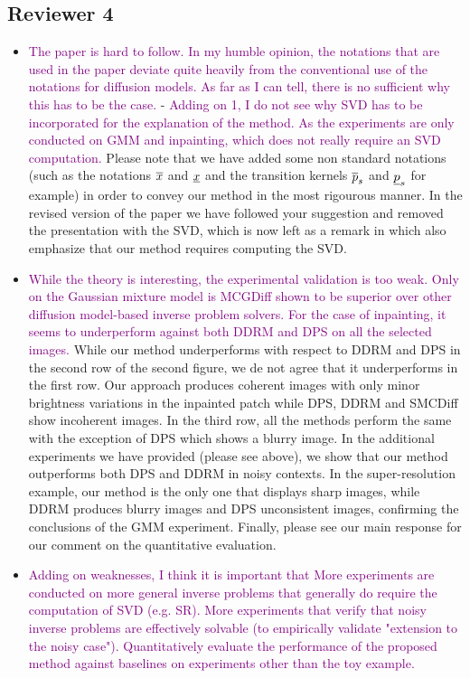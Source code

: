 \documentclass{article}
\newcommand{\question}[1]{\textcolor{purple}{#1}}
\begin{document}
\subsection*{Reviewer 4}
\begin{itemize}
    \item \question{The paper is hard to follow. In my humble opinion, the notations that are used in the paper deviate quite heavily from the conventional use of the notations for diffusion models. As far as I can tell, there is no sufficient why this has to be the case.} - \question{Adding on 1, I do not see why SVD has to be incorporated for the explanation of the method. As the experiments are only conducted on GMM and inpainting, which does not really require an SVD computation.} Please note that we have added some non standard notations (such as the notations $\overline{x}$ and $\underline{x}$ and the transition kernels $\tbwtrans{}{s}{}{}$ and $\bbwtrans{}{s}{}{}$ for example) in order to convey our method in the most rigourous manner. In the revised version of the paper we have followed your suggestion and removed the presentation with the SVD, which is now left as a remark in which also emphasize that our method requires computing the SVD. 
    \item \question{While the theory is interesting, the experimental validation is too weak. Only on the Gaussian mixture model is MCGDiff shown to be superior over other diffusion model-based inverse problem solvers. For the case of inpainting, it seems to underperform against both DDRM and DPS on all the selected images.} While our method underperforms with respect to DDRM and DPS in the second row of the second figure, we de not agree that it underperforms in the first row. Our approach produces coherent images with only minor brightness variations in the inpainted patch while DPS, DDRM and SMCDiff show incoherent images. In the third row, all the methods perform the same with the exception of DPS which shows a blurry image. In the additional experiments we have provided (please see above), we show that our method outperforms both DPS and DDRM in noisy contexts. In the super-resolution example, our method is the only one that displays sharp images, while DDRM produces blurry images and DPS unconsistent images, confirming the conclusions of the GMM experiment. Finally, please see our main response for our comment on the quantitative evaluation. 
    \item \question{Adding on weaknesses, I think it is important that
    More experiments are conducted on more general inverse problems that generally do require the computation of SVD (e.g. SR).
    More experiments that verify that noisy inverse problems are effectively solvable (to empirically validate "extension to the noisy case").
    Quantitatively evaluate the performance of the proposed method against baselines on experiments other than the toy example.}
\end{itemize}
\clearpage
\end{document}
